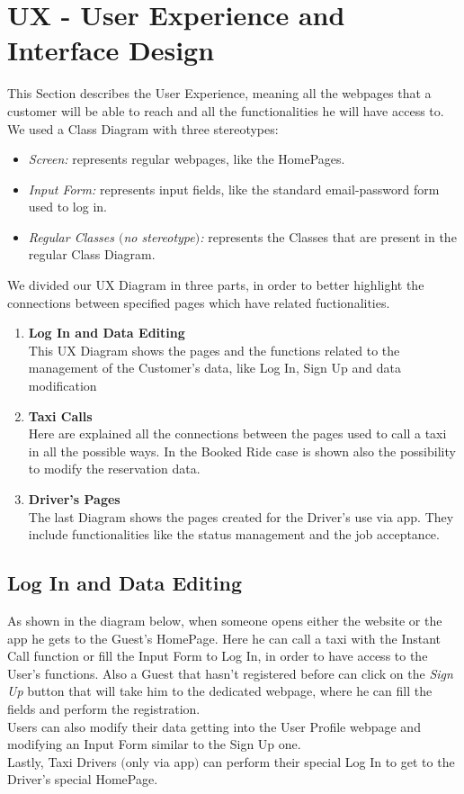 \section{UX - User Experience and Interface Design}

This Section describes the User Experience, meaning all the webpages that a customer will be able to reach and all the functionalities he will have access to.
\newline
We used a Class Diagram with three stereotypes:
\begin {itemize}
\item \textit{Screen:} represents regular webpages, like the HomePages.
\item \textit{Input Form:} represents input fields, like the standard email-password form used to log in.
\item \textit{Regular Classes $($no stereotype$)$:} represents the Classes that are present in the regular Class Diagram.
\end {itemize} 
\hfill
\hfill

We divided our UX Diagram in three parts, in order to better highlight the connections between specified pages which have related fuctionalities.
\begin{enumerate}
\item \textbf{Log In and Data Editing}\\
	This UX Diagram shows the pages and the functions related to the management of the Customer's data, like Log In, Sign Up and data modification
\item \textbf{Taxi Calls}\\
	Here are explained all the connections between the pages used to call a taxi in all the possible ways. 
	In the Booked Ride case is shown also the possibility to modify the reservation data.
\item \textbf{Driver's Pages}\\ 
	The last Diagram shows the pages created for the Driver's use via app. 
	They include functionalities like the status management and the job acceptance.
	
\end{enumerate}
\newpage

\subsection{Log In and Data Editing}
As shown in the diagram below, when someone opens either the website or the app he gets to the Guest's HomePage. Here he can call a taxi with the Instant Call function or fill the Input Form to Log In, in order to have access to the User's functions. Also a Guest that hasn't registered before can click on the \textit{Sign Up} button that will take him to the dedicated webpage, where he can fill the fields and perform the registration.\\
Users can also modify their data getting into the User Profile webpage and modifying an Input Form similar to the Sign Up one. \\
Lastly, Taxi Drivers $($only via app$)$ can perform their special Log In to get to the Driver's special HomePage. 

